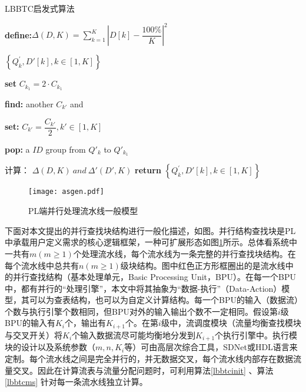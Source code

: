 \begin{algorithm}[!h]
	\caption{LBBTC启发式算法  \label{lbbtcms}}
	\IncMargin{2em}
	\DontPrintSemicolon
	
\textbf{define:}$\Delta(D,K) =\sum ^{K}_{k=1}\left| D\left[ k\right] -\dfrac {100\% }{K}\right| ^{2}$\;

{
	\Return $\left\{ Q^{'}_{k},D'\left[ k\right] ,k\in \left[ 1,K\right] \right\} $\;
}
{
	\textbf{set} $ C_{k_{1}}=2 \cdot C_{k_{1}}$\;
	{
		\textbf{find:} another $C_{k'}$ and 
		
		\textbf{set:} $C_{k'}=\dfrac{C_{k'}}{2},k'\in [1,K]$\; 
	}
	
	{
		\textbf{pop:} a $ID$ group from $Q'_{k}$ to  $Q'_{k_1}$\;
	}
}

计算： $\Delta(D,K)\  and\  \Delta'(D',K) $\;
{
	\textbf{return} $\left\{ Q^{'}_{k},D'\left[ k\right] ,k\in \left[ 1,K\right] \right\} $\;
}
\end{algorithm}

\begin{figure}[!ht]
	\centering 
	\vspace{-1.5mm} 
	\texttt{[image: asgen.pdf]}
	\caption{PL端并行处理流水线一般模型} \label{fig:asgen}
\end{figure}

下面对本文提出的并行查找块结构进行一般化描述，如图。并行结构查找块是PL中承载用户定义需求的核心逻辑框架，一种可扩展形态如图\ref{fig:asgen}所示。总体看系统中一共有$m(m\geq 1)$个处理流水线，每个流水线为一条完整的并行查找块结构。在每个流水线中总共有$ n(m \geq 1) $级块结构。图中红色正方形框圈出的是流水线中的并行查找结构（基本处理单元，Basic Processing Unit，BPU）。在每一个BPU中，都有并行的“处理引擎”，本文中将其抽象为“数据-执行”（Data-Action）模型，其可以为查表结构，也可以为自定义计算结构。每一个BPU的输入（数据流）个数与执行引擎个数相同，但BPU对外的输入输出个数不一定相同。假设第$i$级BPU的输入有$K_i$个，输出有$K_{i+1}$个。在第$i$级中，流调度模块（流量均衡查找模块与交叉开关）将$K_i$个输入数据流尽可能均衡地分发到$K_{i+1}$个执行引擎中。执行模块的设计以及系统参数（$m,n,K_i$等）可由高层次综合工具，SDNet或HDL语言来定制。每个流水线之间是完全并行的，并无数据交叉，每个流水线内部存在数据流量交叉。因此在计算流表与流量分配问题时，可利用算法\ref{lbbtcinit} 、算法\ref{lbbtcms} 针对每一条流水线独立计算。




